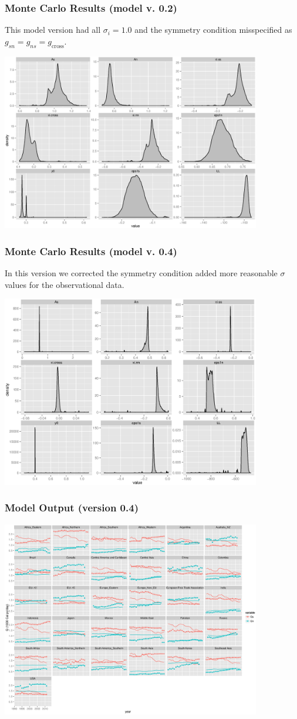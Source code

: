 \documentclass{beamer}
\begin{document}
\begin{frame}
  \frametitle{Monte Carlo Results (model v. 0.2)}
  This model version had all $\sigma_i = 1.0$ and the symmetry
  condition misspecified as $g_{sn} = g_{ns} = g_{\text{cross}}$.
  \begin{center}
    \includegraphics[width=0.85\textwidth]{fig/mcrslt-v0_2-allrgn.eps}
  \end{center}
\end{frame}

\begin{frame}
  \frametitle{Monte Carlo Results (model v. 0.4)}
  In this version we corrected the symmetry condition added
  more reasonable $\sigma$ values for the observational data.
  \begin{center}
    \includegraphics[width=0.85\textwidth]{fig/mcrslt-v0_4-allrgn.eps}
  \end{center}
\end{frame}

\begin{frame}
  \frametitle{Model Output (version 0.4)}
  \begin{center}
    \includegraphics[width=0.85\textwidth]{fig/demand-byyear-allrgn.eps}
  \end{center}
\end{frame}
\end{document}
